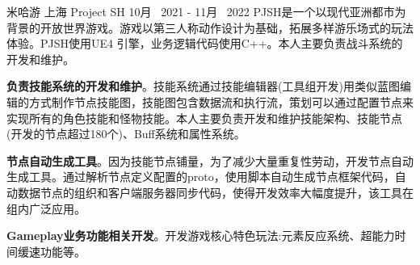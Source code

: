 


\begin{cventries}
	
\cventrycompany
{米哈游} %
{上海} %
\cventryproject
{Project SH} %
{10月~ 2021 - 11月~ 2022} %
{PJSH是一个以现代亚洲都市为背景的开放世界游戏。游戏以第三人称动作设计为基础，拓展多样游乐场式的玩法体验。PJSH使用UE4 引擎，业务逻辑代码使用C++。本人主要负责战斗系统的开发和维护。}
{ %
	\begin{cvitems}
		\item {\textbf{负责技能系统的开发和维护}。技能系统通过技能编辑器(工具组开发)用类似蓝图编辑的方式制作节点技能图，技能图包含数据流和执行流，策划可以通过配置节点来实现所有的角色技能和怪物技能。本人主要负责开发和维护技能架构、技能节点(开发的节点超过180个)、Buff系统和属性系统。 }
		\item{\textbf{节点自动生成工具}。因为技能节点铺量，为了减少大量重复性劳动，开发节点自动生成工具。通过解析节点定义配置的proto，使用脚本自动生成节点框架代码，自动数据节点的组织和客户端服务器同步代码，使得开发效率大幅度提升，该工具在组内广泛应用。}
		\item{\textbf{Gameplay业务功能相关开发}。开发游戏核心特色玩法:元素反应系统、超能力时间缓速功能等。}
	\end{cvitems}
}



\end{cventries}
